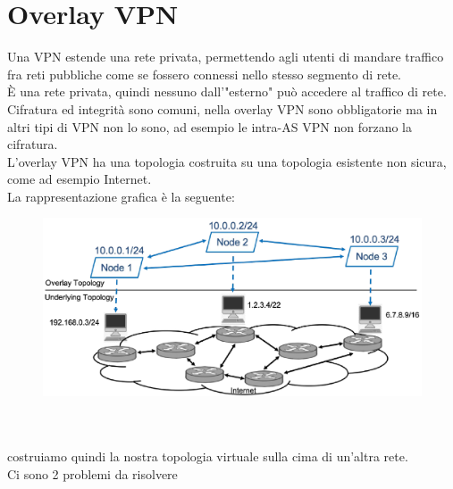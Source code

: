 \documentclass[12pt, oneside]{extbook} %
\begin{document}
\section{Overlay VPN}
Una VPN estende una rete privata, permettendo agli utenti di mandare traffico fra reti pubbliche come se fossero connessi nello stesso segmento di rete.
\\È una rete privata, quindi nessuno dall'"esterno" può accedere al traffico di rete.
\\Cifratura ed integrità sono comuni, nella overlay VPN sono obbligatorie ma in altri tipi di VPN non lo sono, ad esempio le intra-AS VPN non forzano la cifratura.
\\L'overlay VPN ha una topologia costruita su una topologia esistente non sicura, come ad esempio Internet.
\\La rappresentazione grafica è la seguente:\\
\begin{figure}[h!]
    \centering
    \includegraphics[scale=0.5]{../../immagini/vpn_overview}
\end{figure}\\\\
costruiamo quindi la nostra topologia virtuale sulla cima di un'altra rete.
\\Ci sono 2 problemi da risolvere
\end{document}
